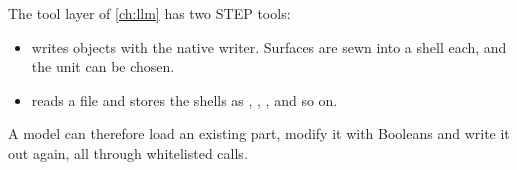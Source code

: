 The tool layer of \cref{ch:llm} has two STEP tools:
\begin{itemize}
  \item {} writes objects with the native writer. Surfaces are sewn into a
    shell each, and the unit can be chosen.
  \item {} reads a file and stores the shells as ,
    , , and so on.
\end{itemize}
A model can therefore load an existing part, modify it with Booleans and write it out again,
all through whitelisted calls.
